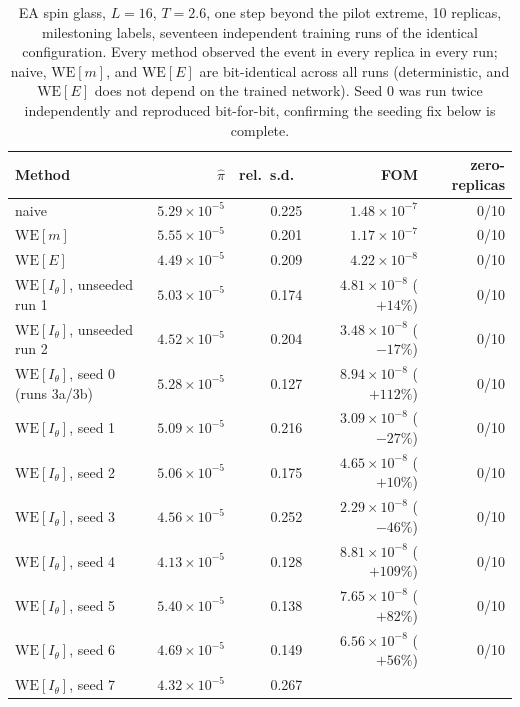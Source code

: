 \documentclass[11pt]{article}
\begin{document}
	\begin{table}[h]
		\centering\small
		\caption{EA spin glass, $L=16$, $T=2.6$, one step beyond the pilot extreme, 10 replicas,
			milestoning labels, seventeen independent training runs of the identical configuration.
			Every method observed the event in every replica in every run; naive,
			$\mathrm{WE}[m]$, and $\mathrm{WE}[E]$ are bit-identical across all runs (deterministic,
			and $\mathrm{WE}[E]$ does not depend on the trained network). Seed 0 was run twice
			independently and reproduced bit-for-bit, confirming the seeding fix below is
			complete.}
		\label{tab:milestone}
		\begin{tabular}{lrrrr}
			\toprule
			Method & $\hat\pi$ & rel.\ s.d.\ & FOM & zero-replicas \\
			\midrule
			naive & $5.29\times10^{-5}$ & 0.225 & $1.48\times10^{-7}$ & 0/10 \\
			$\mathrm{WE}[m]$ & $5.55\times10^{-5}$ & 0.201 & $1.17\times10^{-7}$ & 0/10 \\
			$\mathrm{WE}[E]$ & $4.49\times10^{-5}$ & 0.209 & $4.22\times10^{-8}$ & 0/10 \\
			$\mathrm{WE}[I_\theta]$, unseeded run 1 & $5.03\times10^{-5}$ & 0.174 &
			$4.81\times10^{-8}$ ($+14\%$) & 0/10 \\
			$\mathrm{WE}[I_\theta]$, unseeded run 2 & $4.52\times10^{-5}$ & 0.204 &
			$3.48\times10^{-8}$ ($-17\%$) & 0/10 \\
			$\mathrm{WE}[I_\theta]$, seed 0 (runs 3a/3b) & $5.28\times10^{-5}$ & 0.127 &
			$8.94\times10^{-8}$ ($+112\%$) & 0/10 \\
			$\mathrm{WE}[I_\theta]$, seed 1 & $5.09\times10^{-5}$ & 0.216 &
			$3.09\times10^{-8}$ ($-27\%$) & 0/10 \\
			$\mathrm{WE}[I_\theta]$, seed 2 & $5.06\times10^{-5}$ & 0.175 &
			$4.65\times10^{-8}$ ($+10\%$) & 0/10 \\
			$\mathrm{WE}[I_\theta]$, seed 3 & $4.56\times10^{-5}$ & 0.252 &
			$2.29\times10^{-8}$ ($-46\%$) & 0/10 \\
			$\mathrm{WE}[I_\theta]$, seed 4 & $4.13\times10^{-5}$ & 0.128 &
			$8.81\times10^{-8}$ ($+109\%$) & 0/10 \\
			$\mathrm{WE}[I_\theta]$, seed 5 & $5.40\times10^{-5}$ & 0.138 &
			$7.65\times10^{-8}$ ($+82\%$) & 0/10 \\
			$\mathrm{WE}[I_\theta]$, seed 6 & $4.69\times10^{-5}$ & 0.149 &
			$6.56\times10^{-8}$ ($+56\%$) & 0/10 \\
			$\mathrm{WE}[I_\theta]$, seed 7 & $4.32\times10^{-5}$ & 0.267 &

\end{tabular}
\end{table}
\end{document}
